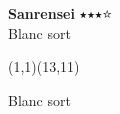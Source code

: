 \documentclass[preview, border=0pt, varwidth=false]{standalone}
\begin{document}
	\setgounit{0.6cm} 
	
\parbox[c][14.65cm][c]{10.2cm}{
	\centering
	
	{\Large\textbf{Sanrensei} $\medblackstar \medblackstar \medblackstar \medwhitestar$ \\ Blanc sort}
	\vspace{3em}
	
	\begin{psgopartialboard}{(1,1)(13,11)}
		\pass
	\end{psgopartialboard}
	
	\vspace{1em}
	Blanc sort
}
\end{document}
